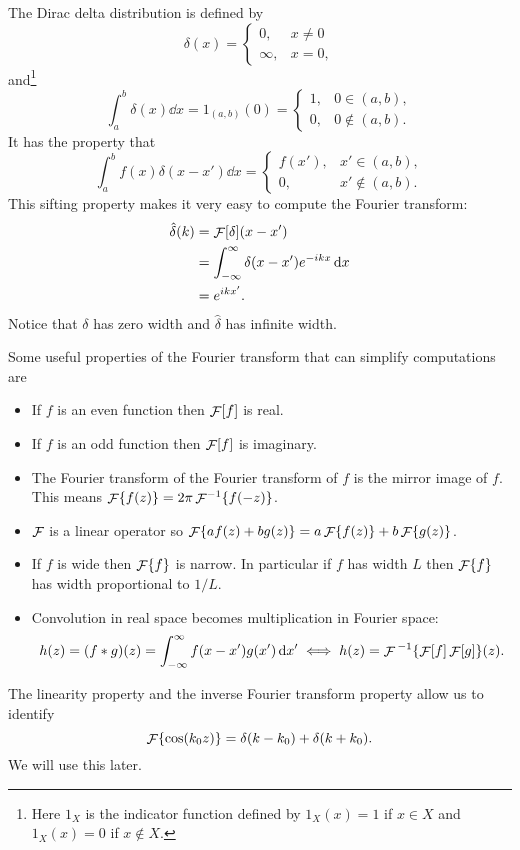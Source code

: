     \begin{example}
        The Dirac delta distribution is defined by
        \[
            \delta(x) =
            \begin{cases}
                0, & x \ne 0\\
                \infty, & x = 0,
            \end{cases}
        \]
        and\footnote{Here \(1_X\) is the indicator function defined by \(1_X(x) = 1\) if \(x \in X\) and \(1_X(x) = 0\) if \(x \notin X\).}
        \[
            \int_{a}^{b} \delta(x) \dd{x} = 1_{(a, b)}(0) =
            \begin{cases}
                1, & 0\in (a, b),\\
                0, & 0\notin (a, b).
            \end{cases}
        \]
        It has the property that
        \[
            \int_{a}^{b} f(x) \delta(x - x')\dd{x} = 
            \begin{cases}
                f(x'), & x'\in (a, b),\\
                0, & x'\notin (a, b).
            \end{cases}
        \]
        This sifting property makes it very easy to compute the Fourier transform:
        \begin{align*}
            \hat{\delta}(k) &= \mathop{\mathcal{F}}[\delta](x - x')\\
            &= \int_{-\infty}^{\infty} \delta(x - x')e^{-ikx}\dd{x}\\
            &= e^{ikx'}.
        \end{align*}
        Notice that \(\delta\) has zero width and \(\hat{\delta}\) has infinite width.
    \end{example}

    Some useful properties of the Fourier transform that can simplify computations are
    \begin{itemize}
        \item If \(f\) is an even function then \(\mathop{\mathcal{F}}[f]\) is real.
        \item If \(f\) is an odd function then \(\mathop{\mathcal{F}}[f]\) is imaginary.
        \item The Fourier transform of the Fourier transform of \(f\) is the mirror image of \(f\).
        This means \(\mathop{\mathcal{F}}\{f(z)\} = 2\pi\mathop{\mathcal{F}}^{-1}\{f(-z)\}\).
        \item \(\mathop{\mathcal{F}}\) is a linear operator so \(\mathop{\mathcal{F}}\{af(z) + bg(z)\} = a\mathop{\mathcal{F}}\{f(z)\} + b\mathop{\mathcal{F}}\{g(z)\}\).
        \item If \(f\) is wide then \(\mathop{\mathcal{F}}\{f\}\) is narrow.
        In particular if \(f\) has width \(L\) then \(\mathop{\mathcal{F}}\{f\}\) has width proportional to \(1/L\).
        \item Convolution in real space becomes multiplication in Fourier space:
        \[h(z) = (f\mathbin{*} g)(z) = \int_{-\infty}^{\infty} f(x - x')g(x') \dd{x'} \iff h(z) = \mathop{\mathcal{F}}{}^{-1}\{\mathop{\mathcal{F}}[f]\mathop{\mathcal{F}}[g]\}(z).\]
    \end{itemize}
    The linearity property and the inverse Fourier transform property allow us to identify
    \[\mathop{\mathcal{F}}\{\cos(k_0z)\} = \delta(k - k_0) + \delta(k + k_0).\]
    We will use this later.
    
